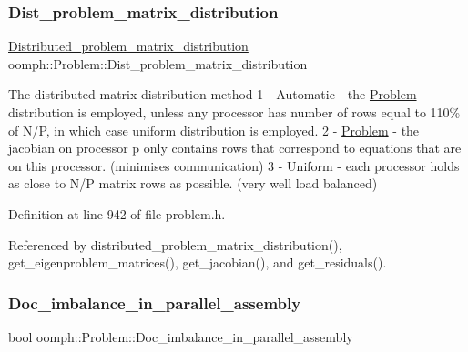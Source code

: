 \subsubsection{\texorpdfstring{Dist\+\_\+problem\+\_\+matrix\+\_\+distribution}{Dist\_problem\_matrix\_distribution}}
{\footnotesize\ttfamily \hyperlink{classoomph_1_1Problem_a8fc1f40f2a9309e9ff02772fa2258402}{Distributed\+\_\+problem\+\_\+matrix\+\_\+distribution} oomph\+::\+Problem\+::\+Dist\+\_\+problem\+\_\+matrix\+\_\+distribution\hspace{0.3cm}{\ttfamily [private]}}



The distributed matrix distribution method 1 -\/ Automatic -\/ the \hyperlink{classoomph_1_1Problem}{Problem} distribution is employed, unless any processor has number of rows equal to 110\% of N/P, in which case uniform distribution is employed. 2 -\/ \hyperlink{classoomph_1_1Problem}{Problem} -\/ the jacobian on processor p only contains rows that correspond to equations that are on this processor. (minimises communication) 3 -\/ Uniform -\/ each processor holds as close to N/P matrix rows as possible. (very well load balanced) 



Definition at line 942 of file problem.\+h.



Referenced by distributed\+\_\+problem\+\_\+matrix\+\_\+distribution(), get\+\_\+eigenproblem\+\_\+matrices(), get\+\_\+jacobian(), and get\+\_\+residuals().

\mbox{\label{classoomph_1_1Problem_a9a20957e3ef4c8142261363c85f6e276}} 
\subsubsection{\texorpdfstring{Doc\+\_\+imbalance\+\_\+in\+\_\+parallel\+\_\+assembly}{Doc\_imbalance\_in\_parallel\_assembly}}
{\footnotesize\ttfamily bool oomph\+::\+Problem\+::\+Doc\+\_\+imbalance\+\_\+in\+\_\+parallel\+\_\+assembly\hspace{0.3cm}{\ttfamily [private]}}



